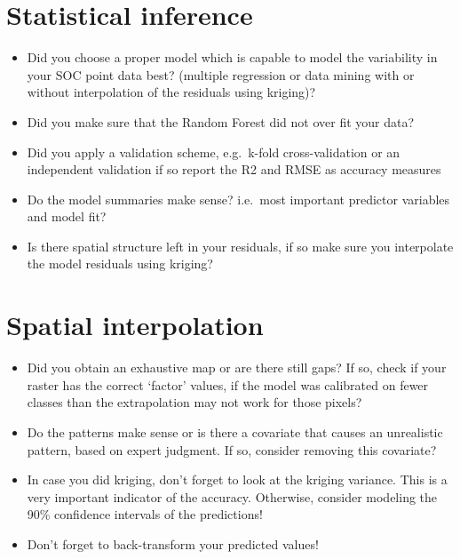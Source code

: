 \documentclass[10pt,b5paper,]{book}
\providecommand{\tightlist}{%
  \setlength{\itemsep}{0pt}\setlength{\parskip}{0pt}}
\theoremstyle{definition}
\theoremstyle{definition}
\theoremstyle{definition}
\theoremstyle{remark}
\begin{document}
\hypertarget{statistical-inference}{%
\section{Statistical inference}\label{statistical-inference}}

\begin{itemize}
\tightlist
\item
  Did you choose a proper model which is capable to model the
  variability in your SOC point data best? (multiple regression or data
  mining with or without interpolation of the residuals using kriging)?
\item
  Did you make sure that the Random Forest did not over fit your data?
\item
  Did you apply a validation scheme, e.g.~k-fold cross-validation or an
  independent validation if so report the R2 and RMSE as accuracy
  measures
\item
  Do the model summaries make sense? i.e.~most important predictor
  variables and model fit?
\item
  Is there spatial structure left in your residuals, if so make sure you
  interpolate the model residuals using kriging?
\end{itemize}

\hypertarget{spatial-interpolation}{%
\section{Spatial interpolation}\label{spatial-interpolation}}

\begin{itemize}
\tightlist
\item
  Did you obtain an exhaustive map or are there still gaps? If so, check
  if your raster has the correct `factor' values, if the model was
  calibrated on fewer classes than the extrapolation may not work for
  those pixels?
\item
  Do the patterns make sense or is there a covariate that causes an
  unrealistic pattern, based on expert judgment. If so, consider
  removing this covariate?
\item
  In case you did kriging, don't forget to look at the kriging variance.
  This is a very important indicator of the accuracy. Otherwise,
  consider modeling the 90\% confidence intervals of the predictions!
\item
  Don't forget to back-transform your predicted values!
\end{itemize}
\end{document}
